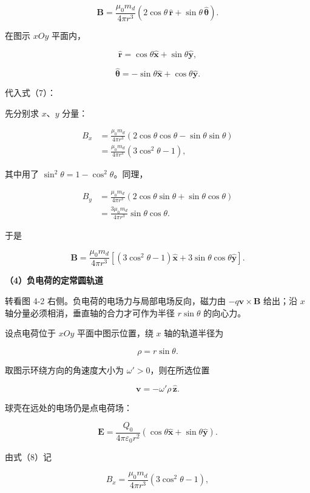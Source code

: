 \documentclass[12pt,a4paper,UTF8]{ctexart}
\begin{document}
\[\boxed{
\boldsymbol B
=\frac{\mu_0m_d}{4\pi r^3}
\left(2\cos\theta\,\hat{\boldsymbol r}
+\sin\theta\,\hat{\boldsymbol\theta}\right)
}. \tag{7}\]

在图示 \(xOy\) 平面内，

\[\hat{\boldsymbol r}=\cos\theta\hat{\boldsymbol x}
+\sin\theta\hat{\boldsymbol y},\]

\[\hat{\boldsymbol\theta}=-\sin\theta\hat{\boldsymbol x}
+\cos\theta\hat{\boldsymbol y}.\]

代入式（7）：

先分别求 \(x\)、\(y\) 分量：

\[\begin{aligned}
B_x
&=\frac{\mu_0m_d}{4\pi r^3}
\left(2\cos\theta\cos\theta
-\sin\theta\sin\theta\right)\\
&=\frac{\mu_0m_d}{4\pi r^3}(3\cos^2\theta-1),
\end{aligned}\]

其中用了 \(\sin^2\theta=1-\cos^2\theta\)。同理，

\[\begin{aligned}
B_y
&=\frac{\mu_0m_d}{4\pi r^3}
\left(2\cos\theta\sin\theta
+\sin\theta\cos\theta\right)\\
&=\frac{3\mu_0m_d}{4\pi r^3}
\sin\theta\cos\theta.
\end{aligned}\]

于是

\[\boxed{
\boldsymbol B=\frac{\mu_0m_d}{4\pi r^3}
\left[(3\cos^2\theta-1)\hat{\boldsymbol x}
+3\sin\theta\cos\theta\hat{\boldsymbol y}\right]
}. \tag{8}\]

\textbf{（4）负电荷的定常圆轨道}

转看图 4-2 右侧。负电荷的电场力与局部电场反向，磁力由
\(-q\bm v\times\bm B\) 给出；沿 \(x\)
轴分量必须相消，垂直轴的合力才可作为半径 \(r\sin\theta\) 的向心力。

设点电荷位于 \(xOy\) 平面中图示位置，绕 \(x\) 轴的轨道半径为

\[\rho=r\sin\theta.\]

取图示环绕方向的角速度大小为 \(\omega'>0\)，则在所选位置

\[\boldsymbol v=-\omega'\rho\,\hat{\boldsymbol z}.\]

球壳在远处的电场仍是点电荷场：

\[\boldsymbol E=\frac{Q_0}{4\pi\varepsilon_0r^2}
(\cos\theta\hat{\boldsymbol x}+\sin\theta\hat{\boldsymbol y}). \tag{9}\]

由式（8）记

\[B_x=\frac{\mu_0m_d}{4\pi r^3}(3\cos^2\theta-1),\]
\end{document}
